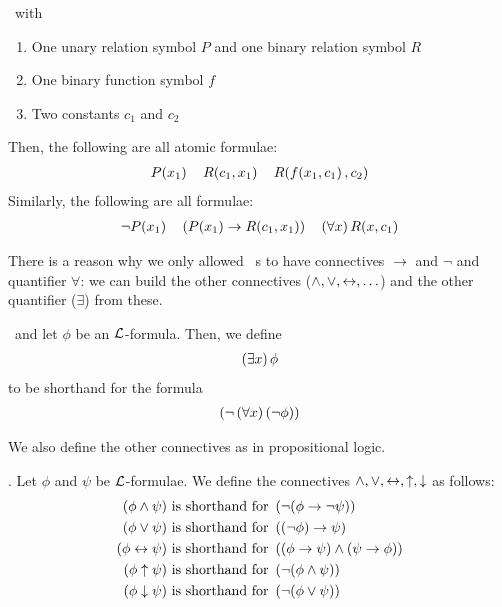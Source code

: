 \begin{boxexample}
    \Letla\ with
    \begin{enumerate}
        \item One unary relation symbol $P$ and one binary relation symbol $R$
        \item One binary function symbol $f$
        \item Two constants $c_1$ and $c_2$
    \end{enumerate}
    Then, the following are all atomic formulae:
    \begin{align*}
        P\!\left( x_1 \right) \quad R\!\left( c_1, x_1 \right) \quad R\!\left( f\!\left( x_1, c_1 \right), c_2 \right)
    \end{align*}
    Similarly, the following are all formulae:
    \begin{align*}
        \neg P\!\left( x_1 \right) \quad \left( P\!\left( x_1 \right) \to R\!\left( c_1, x_1 \right) \right) \quad \left( \forall x \right) R\!\left( x, c_1 \right)
    \end{align*}
\end{boxexample}

There is a reason why we only allowed \fola~s to have connectives $\to$ and $\neg$ and quantifier $\forall$: we can build the other connectives ($\land, \lor, \leftrightarrow, \ldots$) and the other quantifier ($\exists$) from these.

\begin{boxdefinition}
    \Letla\ and let $\phi$ be an $\mathcal{L}$-formula. Then, we define
    \begin{align*}
        \left( \exists x \right) \phi
    \end{align*}
    to be shorthand for the formula
    \begin{align*}
        \left( \neg\left( \forall x \right)\left( \neg \phi \right) \right)
    \end{align*}
\end{boxdefinition}

We also define the other connectives as in propositional logic.

\begin{boxdefinition}[Connectives]
    \Letla. Let $\phi$ and $\psi$ be $\mathcal{L}$-formulae. We define the connectives $\land, \lor, \leftrightarrow, \uparrow, \downarrow$ as follows:
    \begin{align*}
        \left( \phi \land \psi \right) &\text{ is shorthand for } \left( \neg (\phi \to \neg \psi) \right) \\
        \left( \phi \lor \psi \right) &\text{ is shorthand for } \left( \left( \neg \phi \right) \to \psi \right) \\
        \left( \phi \leftrightarrow \psi \right) &\text{ is shorthand for } \left( (\phi \to \psi) \land (\psi \to \phi) \right) \\
        \left( \phi \uparrow \psi \right) &\text{ is shorthand for } \left( \neg (\phi \land \psi) \right) \\
        \left( \phi \downarrow \psi \right) &\text{ is shorthand for } \left( \neg (\phi \lor \psi) \right)
    \end{align*}
\end{boxdefinition}

